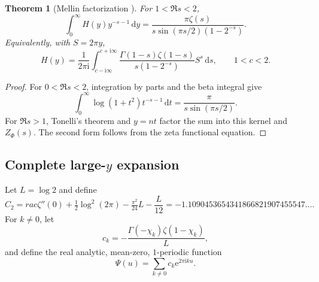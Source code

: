 \documentclass[11pt]{article}
\numberwithin{equation}{section}
\newtheorem{theorem}{Theorem}[section]
\theoremstyle{definition}
\theoremstyle{remark}
\newcommand{\dd}{\,\mathrm d}
\newcommand{\e}{\mathrm e}
\newcommand{\ii}{\mathrm i}
\begin{document}
\begin{theorem}[Mellin factorization \NewResult]
\label{p2:thm:Mellin}
For $1<\Re s<2$,
\begin{equation}
 \int_0^\infty H(y)y^{-s-1}\dd y
 =\frac{\pi\zeta(s)}{s\sin(\pi s/2)(1-2^{-s})}.            \label{p2:eq:Mellin}
\end{equation}
Equivalently, with $S=2\pi y$,
\begin{equation}
 H(y)=\frac1{2\pi\ii}\int_{c-\ii\infty}^{c+\ii\infty}
 \frac{\Gamma(1-s)\zeta(1-s)}{s(1-2^{-s})}S^s\dd s,
 \qquad 1<c<2.                                             \label{p2:eq:Mellin-inv}
\end{equation}
\end{theorem}

\begin{proof}
For $0<\Re s<2$, integration by parts and the beta integral give
\begin{equation}
 \int_0^\infty\log(1+t^2)t^{-s-1}\dd t
 =\frac{\pi}{s\sin(\pi s/2)}.                             \label{p2:eq:kernel-Mellin}
\end{equation}
For $\Re s>1$, Tonelli's theorem and $y=nt$ factor the sum into this kernel and
$Z_\Phi(s)$.  The second form follows from the zeta functional equation.
\end{proof}

\subsection{Complete large-$y$ expansion}

Let $L=\log2$ and define
\begin{equation}
 C_2=
rac{\zeta''(0)+\tfrac12\log^2(2\pi)-\tfrac{\pi^2}{24}}{L}
     -\frac{L}{12}
 =-1.1090453654341866821907455547\ldots.                  \label{p2:eq:C2}
\end{equation}
For $k\ne0$, let
\begin{equation}
 c_k=-\frac{\Gamma(-\chi_k)\zeta(1-\chi_k)}{L},            \label{p2:eq:ck}
\end{equation}
and define the real analytic, mean-zero, $1$-periodic function
\begin{equation}
 \Psi(u)=\sum_{k\ne0}c_k\e^{2\pi\ii ku}.                  \label{p2:eq:Psi}
\end{equation}
\end{document}
